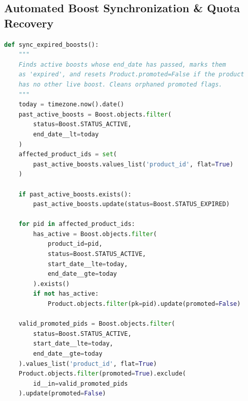 \documentclass[12pt,a4paper]{article}
\begin{document}
\subsection{Automated Boost Synchronization \& Quota Recovery}
\begin{lstlisting}[language=Python, caption={Authoritative Boost Expiration Service}]
def sync_expired_boosts():
    """
    Finds active boosts whose end_date has passed, marks them
    as 'expired', and resets Product.promoted=False if the product
    has no other live boost. Cleans orphaned promoted flags.
    """
    today = timezone.now().date()
    past_active_boosts = Boost.objects.filter(
        status=Boost.STATUS_ACTIVE, 
        end_date__lt=today
    )
    affected_product_ids = set(
        past_active_boosts.values_list('product_id', flat=True)
    )

    if past_active_boosts.exists():
        past_active_boosts.update(status=Boost.STATUS_EXPIRED)

    for pid in affected_product_ids:
        has_active = Boost.objects.filter(
            product_id=pid,
            status=Boost.STATUS_ACTIVE,
            start_date__lte=today,
            end_date__gte=today
        ).exists()
        if not has_active:
            Product.objects.filter(pk=pid).update(promoted=False)

    valid_promoted_pids = Boost.objects.filter(
        status=Boost.STATUS_ACTIVE,
        start_date__lte=today,
        end_date__gte=today
    ).values_list('product_id', flat=True)
    Product.objects.filter(promoted=True).exclude(
        id__in=valid_promoted_pids
    ).update(promoted=False)
\end{lstlisting}
\end{document}
